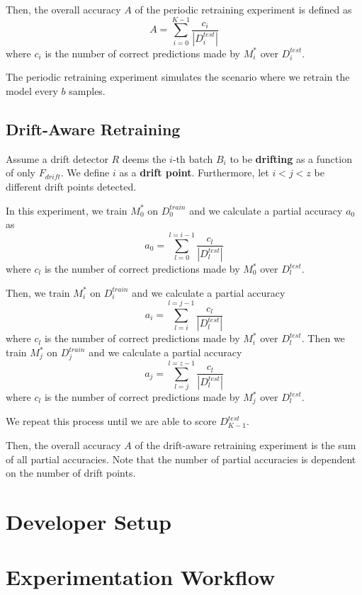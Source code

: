 Then, the overall accuracy $A$ of the periodic retraining experiment
is defined as $$A = \sum_{i=0}^{K-1} \frac{c_i}{|D_i^{test}|}$$
where $c_i$ is the number of correct predictions made by $M_i^*$ over $D_i^{test}$.

The periodic retraining experiment simulates the scenario where we
retrain the model every $b$ samples.
\subsection{Drift-Aware Retraining\label{sec:drift_aware_retraining}}
Assume a drift detector $R$ deems the $i$-th batch $B_i$ to be
\textbf{drifting} as a function of only $F_{drift}$.
We define $i$ as a \textbf{drift point}.
Furthermore, let $i < j < z$ be different drift points detected.

In this experiment, we train $M_0^*$ on $D_0^{train}$ and
we calculate a partial accuracy $a_0$ as
$$a_0 = \sum_{l=0}^{l=i-1} \frac{c_l}{|D_l^{test}|}$$
where $c_l$ is the number of correct predictions made by $M_0^*$ over $D_l^{test}$.

Then, we train $M_i^*$ on $D_i^{train}$ and we calculate a partial accuracy
$$a_i = \sum_{l=i}^{l=j-1} \frac{c_l}{|D_l^{test}|}$$
where $c_l$ is the number of correct predictions made by $M_i^*$ over $D_l^{test}$.
Then we train $M_j^*$ on $D_j^{train}$ and we calculate a partial accuracy
$$a_j = \sum_{l=j}^{l=z-1} \frac{c_l}{|D_l^{test}|}$$
where $c_l$ is the number of correct predictions made by $M_j^*$ over $D_l^{test}$.

We repeat this process until we are able to score
$D_{K-1}^{test}$.

Then, the overall accuracy $A$ of the drift-aware retraining experiment
is the sum of all partial accuracies. Note that the number of partial
accuracies is dependent on the number of drift points.

\section{Developer Setup}

\section{Experimentation Workflow\label{sec:workflow}}
